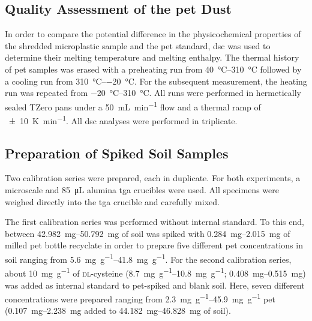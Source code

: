 \subsection{Quality Assessment of the \Acs{pet} Dust}

In order to compare the potential difference in the physicochemical properties of the shredded microplastic sample and the \ac{pet} standard, \ac{dsc} was used to determine their melting temperature and melting enthalpy.
The thermal history of \ac{pet} samples was erased with a preheating run from \SIrange[range-phrase = { to }]{40}{310}{\degreeCelsius} followed by a cooling run from \SIrange[range-phrase = { to }]{310}{-20}{\degreeCelsius}.
For the subsequent measurement, the heating run was repeated from \SIrange[range-phrase = { to }]{-20}{310}{\degreeCelsius}. All runs were performed in hermetically sealed TZero pans under a \SI{50}{\milli\liter\per\minute}  flow and a thermal ramp of \SI{+-10}{\kelvin\per\minute}. All \ac{dsc} analyses were performed in triplicate.

\subsection{Preparation of Spiked Soil Samples}

Two calibration series were prepared, each in duplicate. For both experiments, a microscale and \SI{85}{\micro\liter} alumina \ac{tga} crucibles were used. All specimens were weighed directly into the \ac{tga} crucible and carefully mixed.

The first calibration series was performed without internal standard. To this end, between \SIrange[range-phrase = { and }]{42.982}{50.792}{\milli\gram} of soil was spiked with \SIrange{0.284}{2.015}{\milli\gram} of milled \ac{pet} bottle recyclate in order to prepare five different \ac{pet} concentrations in soil ranging from \SIrange{5.6}{41.8}{\milli\gram\per\gram}.
For the second calibration series, about \SI{10}{\milli\gram\per\gram} of \textsc{dl}-cysteine (\SIrange{8.7}{10.8}{\milli\gram\per\gram}; \SIrange{0.408}{0.515}{\milli\gram}) was added as internal standard to \ac{pet}-spiked and blank soil.
Here, seven different concentrations were prepared ranging from \SIrange[range-phrase = { to }]{2.3}{45.9}{\milli\gram\per\gram} \ac{pet} (\SIrange{0.107}{2.238}{\milli\gram} added to \SIrange{44.182}{46.828}{\milli\gram} of soil).

